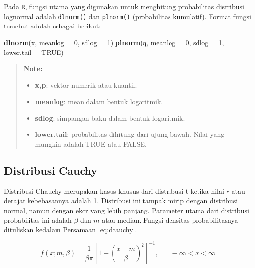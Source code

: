 \documentclass[]{book}
\newenvironment{Shaded}{\begin{snugshade}}{\end{snugshade}}
\newcommand{\KeywordTok}[1]{\textcolor[rgb]{0.13,0.29,0.53}{\textbf{#1}}}
\newcommand{\DataTypeTok}[1]{\textcolor[rgb]{0.13,0.29,0.53}{#1}}
\newcommand{\DecValTok}[1]{\textcolor[rgb]{0.00,0.00,0.81}{#1}}
\newcommand{\OtherTok}[1]{\textcolor[rgb]{0.56,0.35,0.01}{#1}}
\newcommand{\NormalTok}[1]{#1}
\providecommand{\tightlist}{%
  \setlength{\itemsep}{0pt}\setlength{\parskip}{0pt}}
\begin{document}
Pada \texttt{R}, fungsi utama yang digunakan untuk menghitung
probabilitas distribusi lognormal adalah \texttt{dlnorm()} dan
\texttt{plnorm()} (probabilitas kumulatif). Format fungsi tersebut
adalah sebagai berikut:

\begin{Shaded}
\begin{Highlighting}[]
\KeywordTok{dlnorm}\NormalTok{(x, }\DataTypeTok{meanlog =} \DecValTok{0}\NormalTok{, }\DataTypeTok{sdlog =} \DecValTok{1}\NormalTok{)}
\KeywordTok{plnorm}\NormalTok{(q, }\DataTypeTok{meanlog =} \DecValTok{0}\NormalTok{, }\DataTypeTok{sdlog =} \DecValTok{1}\NormalTok{, }\DataTypeTok{lower.tail =} \OtherTok{TRUE}\NormalTok{)}
\end{Highlighting}
\end{Shaded}

\begin{quote}
\textbf{Note: }

\begin{itemize}
\tightlist
\item
  \textbf{x,p}: vektor numerik atau kuantil.
\item
  \textbf{meanlog}: mean dalam bentuk logaritmik.
\item
  \textbf{sdlog}: simpangan baku dalam bentuk logaritmik.
\item
  \textbf{lower.tail}: probabilitas dihitung dari ujung bawah. Nilai
  yang mungkin adalah TRUE atau FALSE.
\end{itemize}
\end{quote}

\subsection{Distribusi Cauchy}\label{distribusi-cauchy}

Distribusi Chauchy merupakan kasus khusus dari distribusi t ketika nilai
\(r\) atau derajat kebebasannya adalah 1. Distribusi ini tampak mirip
dengan distribusi normal, namun dengan ekor yang lebih panjang.
Parameter utama dari distribusi probabilitas ini adalah \(\beta\) dan
\(m\) atau median. Fungsi densitas probabilitasnya dituliskan kedalam
Persamaan \eqref{eq:dcauchy}.

\begin{equation}
   f\left(x;m,\beta\right)=\frac{1}{\beta\pi}\left[1+\left(\frac{x-m}{\beta}\right)^2\right]^{-1},\ \ \ \ \ \ \ \ -\infty<x<\infty
  \label{eq:dcauchy}
\end{equation}
\end{document}
